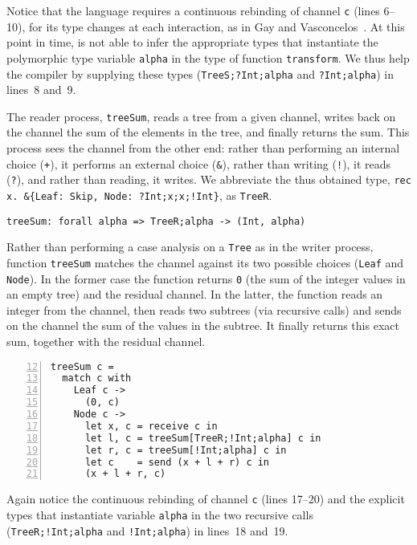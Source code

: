 Notice that the language requires a continuous rebinding of channel
\lstinline|c| (lines 6--10), for its type changes at each interaction,
as in Gay and Vasconcelos~\cite{DBLP:journals/jfp/GayV10}.
%
At this point in time, \freest{} is not able to infer the appropriate
types that instantiate the polymorphic type variable \lstinline|alpha|
in the type of function \lstinline|transform|. We thus help the
compiler by supplying these types (\lstinline|TreeS;?Int;alpha| and
\lstinline|?Int;alpha|) in lines~8 and~9.

The reader process, \lstinline|treeSum|, reads a tree from a given
channel, writes back on the channel the sum of the elements in the
tree, and finally returns the sum. This process sees the channel from
the other end: rather than performing an internal choice
(\lstinline|+|), it performs an external choice (\lstinline|&|),
rather than writing (\lstinline|!|), it reads (\lstinline|?|), and
rather than reading, it writes. We abbreviate the thus obtained type,
\lstinline|rec x. &{Leaf: Skip, Node: ?Int;x;x;!Int}|, as
\lstinline|TreeR|.
%
\begin{lstlisting}
treeSum: forall alpha => TreeR;alpha -> (Int, alpha)
\end{lstlisting}

Rather than performing a case analysis on a \lstinline|Tree| as in the
writer process, function \lstinline|treeSum| matches the channel
against its two possible choices (\lstinline|Leaf| and
\lstinline|Node|). In the former case the function returns
\lstinline|0| (the sum of the integer values in an empty tree) and the
residual channel. In the latter, the function reads an integer from
the channel, then reads two subtrees (via recursive calls) and sends
on the channel the sum of the values in the subtree. It finally
returns this exact sum, together with the residual channel.
%
\label{lst:treeSum}
\begin{lstlisting}[numbers=left,firstnumber=12]
treeSum c =
  match c with
    Leaf c ->
      (0, c)
    Node c ->
      let x, c = receive c in
      let l, c = treeSum[TreeR;!Int;alpha] c in
      let r, c = treeSum[!Int;alpha] c in
      let c    = send (x + l + r) c in
      (x + l + r, c)
\end{lstlisting}

Again notice the continuous rebinding of channel \lstinline|c| (lines
17--20) and the explicit types that instantiate variable
\lstinline|alpha| in the two recursive calls
(\lstinline|TreeR;!Int;alpha| and \lstinline|!Int;alpha|) in lines~18
and~19.

